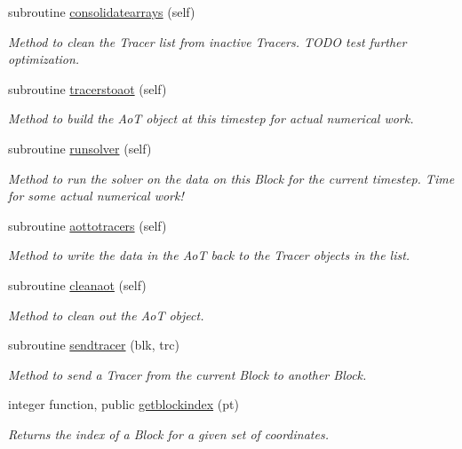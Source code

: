 \begin{DoxyCompactItemize}
subroutine \mbox{\hyperlink{namespaceblocks__mod_a25ff530b5125e4cee5b1f474b2491883}{consolidatearrays}} (self)
\begin{DoxyCompactList}\small\item\em Method to clean the Tracer list from inactive Tracers. T\+O\+DO test further optimization. \end{DoxyCompactList}\item 
subroutine \mbox{\hyperlink{namespaceblocks__mod_ae7afa742f8f89a6a8afdefb7f8c87efd}{tracerstoaot}} (self)
\begin{DoxyCompactList}\small\item\em Method to build the AoT object at this timestep for actual numerical work. \end{DoxyCompactList}\item 
subroutine \mbox{\hyperlink{namespaceblocks__mod_a3245bdadbec6bb123c517921d1503b48}{runsolver}} (self)
\begin{DoxyCompactList}\small\item\em Method to run the solver on the data on this Block for the current timestep. Time for some actual numerical work! \end{DoxyCompactList}\item 
subroutine \mbox{\hyperlink{namespaceblocks__mod_a27c7e788c5f3979bfe9d43aad138286a}{aottotracers}} (self)
\begin{DoxyCompactList}\small\item\em Method to write the data in the AoT back to the Tracer objects in the list. \end{DoxyCompactList}\item 
subroutine \mbox{\hyperlink{namespaceblocks__mod_a6cc313e046daa2720cbca810d083faa0}{cleanaot}} (self)
\begin{DoxyCompactList}\small\item\em Method to clean out the AoT object. \end{DoxyCompactList}\item 
subroutine \mbox{\hyperlink{namespaceblocks__mod_a5a9992de40470e417ec8e40e688f6a0e}{sendtracer}} (blk, trc)
\begin{DoxyCompactList}\small\item\em Method to send a Tracer from the current Block to another Block. \end{DoxyCompactList}\item 
integer function, public \mbox{\hyperlink{namespaceblocks__mod_a62e8fb0d6b2535b4499c7a4d848c24ba}{getblockindex}} (pt)
\begin{DoxyCompactList}\small\item\em Returns the index of a Block for a given set of coordinates. \end{DoxyCompactList}\item 

\end{DoxyCompactItemize}
